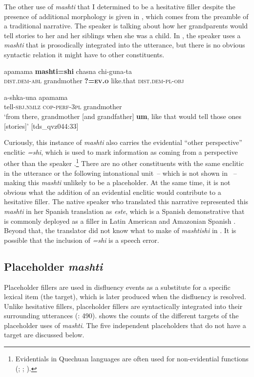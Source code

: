 \documentclass[output=paper]{langscibook}
\begin{document}
The other use of \textit{mashti} that I determined to be a hesitative filler despite the presence of additional morphology is given in , which comes from the preamble of a traditional narrative. The speaker is talking about how her grandparents would tell stories to her and her siblings when she was a child. In , the speaker uses a \textit{mashti} that is prosodically integrated into the utterance, but there is no obvious syntactic relation it might have to other constituents.

\ea%
\label{ex:rice:6}
  {apamama} {\textbf{mashti=shi}} {chasna} {chi-guna-ta}\\
{\textsc{dist.dem-abl}} {grandmother} {\textbf{?=\textsc{ev.o}}} {like.that}  {\textsc{dist.dem-pl-obj}}\\
\medskip

 {a-shka-una} {apamama}\\
{tell-\textsc{sbj.nmlz}}  {\textsc{cop-perf-3pl}}  {grandmother}\\
\glt ‘from there, grandmother [and grandfather] \textbf{um}, like that would tell those ones [stories]’ [tds\_qvz044:33]
\z

Curiously, this instance of \textit{mashti} also carries the evidential “other perspective” enclitic \textit{=shi}, which is used to mark information as coming from a perspective other than the speaker \citep{Nuck2018}.\footnote{Evidentials in Quechuan languages are often used for non-evidential functions (\citealt{Bendezu-Araujo2023}; \citealt{Grzech2016}; \citealt{Nuckolls2014a}).} There are no other constituents with the same enclitic in the utterance or the following intonational unit~-- which is not shown in ~-- making this \textit{mashti} unlikely to be a placeholder. At the same time, it is not obvious what the addition of an evidential enclitic would contribute to a hesitative filler. The native speaker who translated this narrative represented this \textit{mashti} in her Spanish translation as \textit{este}, which is a Spanish demonstrative that is commonly deployed as a filler in Latin American and Amazonian Spanish \citep{Vallejos-Yopán2023}. Beyond that, the translator did not know what to make of \textit{mashtishi} in . It is possible that the inclusion of \textit{=shi} is a speech error.

\subsection{Placeholder \textit{mashti}}
\label{sec:rice:3.2}
Placeholder fillers are used in disfluency events as a substitute for a specific lexical item (the target), which is later produced when the disfluency is resolved. Unlike hesitative fillers, placeholder fillers are syntactically integrated into their surrounding utterances (\citealt{HayashiYoon2006}: 490).  shows the counts of the different targets of the placeholder uses of \textit{mashti}. The five independent placeholders that do not have a target are discussed below.
\end{document}
